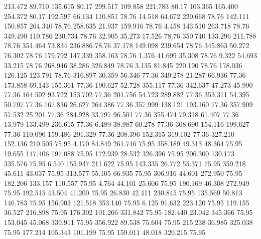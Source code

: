  213.472   89.710  135.615        80.17
 299.517  109.858  221.783        80.17
 103.365  165.400  254.372        80.17
 192.597   66.134  110.851        78.76
  14.518   64.672  220.668        78.76
 142.111  150.857  264.340        78.76
 258.635   21.937  159.916        78.76
   4.458  143.510  263.718        78.76
 349.490  110.786  230.734        78.76
  32.905   35.273   17.526        78.76
 350.740  133.296  211.788        78.76
 351.464   73.834  236.886        78.76
  37.178  149.098  239.654        78.76
 345.863   50.272   76.302        78.76
 179.792  147.339  358.163        78.76
   1.376   41.699   35.308        78.76
   9.322   54.693   33.215        78.76
 268.946   38.286  326.849        78.76
   3.135   81.845  220.190        78.76
 178.036  126.125  123.791        78.76
 316.897   30.359   56.346        77.36
 349.278   21.287   66.936        77.36
 173.858   69.143  155.361        77.36
 190.627   52.728  355.117        77.36
 342.637   47.273   45.990        77.36
 164.502   93.722  153.702        77.36
 201.756   54.723  289.882        77.36
 353.311   54.395   50.797        77.36
 167.836   26.627  264.386        77.36
 357.999  138.121  193.160        77.36
 357.909   57.532   25.201        77.36
 284.928   33.797   96.501        77.36
 355.474   79.318   61.407        77.36
  13.979  133.499  236.615        77.36
   6.489   38.987   60.278        77.36
 308.690  154.116  199.627        77.36
 110.090  159.486  291.329        77.36
 208.396  152.315  319.102        77.36
 327.210  152.136  210.505        75.95
   4.170   84.849  261.746        75.95
 358.189   49.313   48.364        75.95
  19.655  147.406  197.088        75.95
 172.939   28.532  326.396        75.95
 206.300  130.173  335.576        75.95
   6.540  155.947  211.622        75.95
 143.335   26.772   55.371        75.95
 359.218   45.611   43.037        75.95
 313.577   55.105   66.935        75.95
 306.916   44.601  272.950        75.95
 182.206  133.157  110.557        75.95
   4.764   44.101   25.606        75.95
 190.169   46.308  272.949        75.95
 192.515   43.504   41.200        75.95
  26.830   42.411  230.845        75.95
 135.569   50.813  146.783        75.95
 156.903  121.518  353.140        75.95
   6.125   91.632  223.120        75.95
 119.155   36.527  216.898        75.95
 176.302  101.266  331.842        75.95
 182.440   23.042  345.366        75.95
 153.045   45.068  339.911        75.95
 356.922   89.538   75.604        75.95
 215.238   36.985  325.038        75.95
 177.214  105.343  101.199        75.95
 159.011   48.018  320.215        75.95
